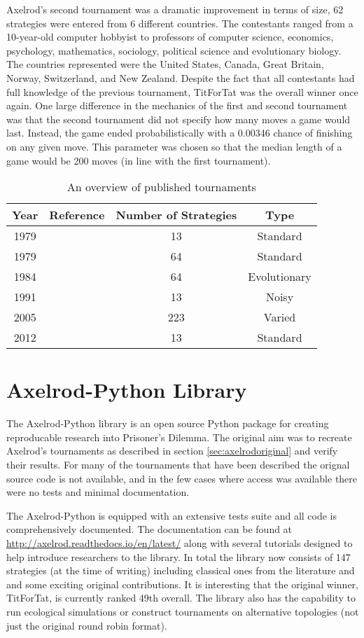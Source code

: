 Axelrod's second tournament was a dramatic improvement in terms of size, 62 strategies were entered from 6 different countries.
The contestants ranged from a 10-year-old computer hobbyist to professors of computer science, economics, psychology, mathematics, sociology, political science and evolutionary biology.
The countries represented were the United States, Canada, Great Britain, Norway, Switzerland, and New Zealand.
Despite the fact that all contestants had full knowledge of the previous tournament, TitForTat was the overall winner once again.
One large difference in the mechanics of the first and second tournament was that the second tournament did not specify how many moves a game would last.
Instead, the game ended probabilistically with a 0.00346 chance of finishing on any given move.
This parameter was chosen so that the median length of a game would be 200 moves (in line with the first tournament).

\begin{table}[htbp]
\centering
\begin{tabular}{c c c c}
Year & Reference & Number of Strategies & Type\\
\hline
1979 & \cite{Axelrod1980a} & 13 & Standard\\
1979 & \cite{Axelrod1980b} & 64 & Standard\\
1984 & & 64 & Evolutionary\\
1991 & & 13 & Noisy\\
2005 & & 223 & Varied\\
2012 & & 13 & Standard\\
\hline
\end{tabular}
\label{tab:tournament_refs}
\caption{An overview of published tournaments}
\end{table}

\section{Axelrod-Python Library}

The Axelrod-Python library \cite{axelrodproject} is an open source Python package for creating reproducable research into Prisoner's Dilemma.
The original aim was to recreate Axelrod's tournaments as described in section \ref{sec:axelrodoriginal} and verify their results.
For many of the tournaments that have been described the orignal source code is not available, and in the few cases where access was available there were no tests and minimal documentation.

The Axelrod-Python is equipped with an extensive tests suite and all code is comprehensively documented.
The documentation can be found at \url{http://axelrod.readthedocs.io/en/latest/} along with several tutorials designed to help introduce researchers to the library.
In total the library now consists of 147 strategies (at the time of writing) including classical ones from the literature and and some exciting original contributions.
It is interesting that the original winner, TitForTat, is currently ranked 49th overall.
The library also has the capability to run ecological simulations or construct tournaments on alternative topologies (not just the original round robin format).

